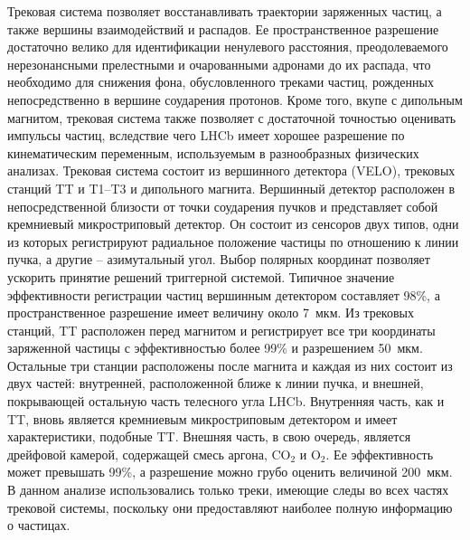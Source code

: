Трековая система позволяет восстанавливать траектории заряженных частиц, 
а также вершины взаимодействий и распадов. Ее пространственное 
разрешение достаточно велико для идентификации ненулевого расстояния, 
преодолеваемого нерезонансными прелестными и очарованными адронами до их 
распада, что необходимо для снижения фона, обусловленного треками 
частиц, рожденных непосредственно в вершине соударения протонов. Кроме 
того, вкупе с дипольным магнитом, трековая система также позволяет 
с достаточной точностью оценивать импульсы частиц, вследствие чего LHCb 
имеет хорошее разрешение по кинематическим переменным, используемым 
в разнообразных физических анализах.
%
Трековая система состоит из вершинного детектора (VELO), трековых 
станций TT и T1--T3 и дипольного магнита.
%
Вершинный детектор расположен в непосредственной близости от точки 
соударения пучков и представляет собой кремниевый микростриповый 
детектор. Он состоит из сенсоров двух типов, одни из которых 
регистрируют радиальное положение частицы по отношению к линии пучка, 
а другие -- азимутальный угол. Выбор полярных координат позволяет 
ускорить принятие решений триггерной системой. Типичное значение 
эффективности регистрации частиц вершинным детектором составляет 98\%, 
а пространственное разрешение имеет величину около 7~мкм.
%
Из трековых станций, TT расположен перед магнитом и регистрирует все три 
координаты заряженной частицы с эффективностью более 99\% и разрешением 
50~мкм. Остальные три станции расположены после магнита и каждая из них 
состоит из двух частей: внутренней, расположенной ближе к линии пучка, 
и внешней, покрывающей остальную часть телесного угла LHCb. Внутренняя 
часть, как и TT, вновь является кремниевым микростриповым детектором 
и имеет характеристики, подобные TT. Внешняя часть, в свою очередь, 
является дрейфовой камерой, содержащей смесь аргона, CO$_2$ и O$_2$. Ее 
эффективность может превышать 99\%, а разрешение можно грубо оценить 
величиной 200~мкм.
%
В данном анализе использовались только треки, имеющие следы во всех 
частях трековой системы, поскольку они предоставляют наиболее полную 
информацию о частицах.


